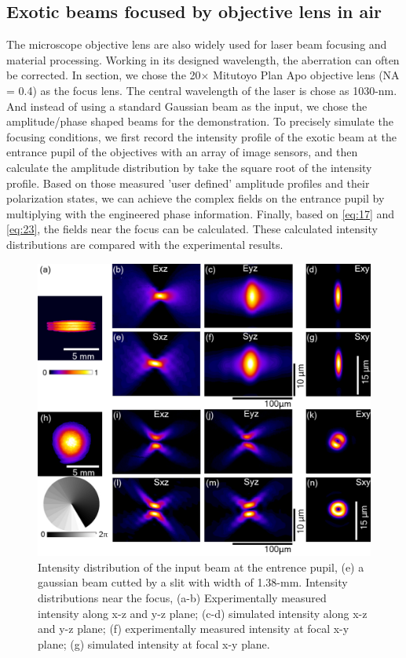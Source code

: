 \documentclass[9pt,twocolumn,twoside]{osajnl}
\begin{document}
\subsection{Exotic beams focused by objective lens in air}
The microscope objective lens are also widely used for laser beam focusing and material processing. Working in its designed wavelength, the aberration can often be corrected. In section, we chose the 20$\times$ Mitutoyo Plan Apo objective lens (NA = 0.4) as the focus lens. The central wavelength of the laser is chose as 1030-nm. And instead of using a standard Gaussian beam as the input, we chose the amplitude/phase shaped beams for the demonstration. To precisely simulate the focusing conditions, we first record the intensity profile of the exotic beam at the entrance pupil of the objectives with an array of image sensors, and then calculate the amplitude distribution by take the square root of the intensity profile. Based on those measured 'user defined' amplitude profiles and their polarization states, we can achieve the complex fields on the entrance pupil by multiplying with the engineered phase information. Finally, based on \eqref{eq:17} and \eqref{eq:23}, the fields near the focus can be calculated. These calculated intensity distributions are compared with the experimental results. 

\begin{figure}
	\centering
	\includegraphics[width=\linewidth]{../AppOptics/figures/20xairExotic.pdf}
	\caption{Intensity distribution of the input beam at the entrence pupil, (e) a gaussian beam cutted by a slit with width of 1.38-mm. Intensity distributions near the focus, (a-b) Experimentally measured intensity along x-z and y-z plane; (c-d) simulated intensity along x-z and y-z plane; (f) experimentally measured intensity at focal x-y plane; (g) simulated intensity at focal x-y plane. }\label{fig:4}
\end{figure}
\end{document}
